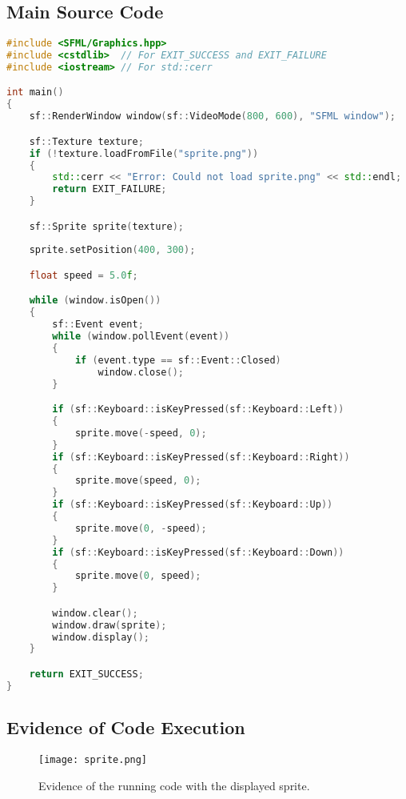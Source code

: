 \documentclass[12pt,a4paper]{article}
\begin{document}
\subsection{Main Source Code}
\begin{lstlisting}[language=C++, caption=Main Source Code for PS0]
#include <SFML/Graphics.hpp>
#include <cstdlib>  // For EXIT_SUCCESS and EXIT_FAILURE
#include <iostream> // For std::cerr

int main()
{
    sf::RenderWindow window(sf::VideoMode(800, 600), "SFML window");

    sf::Texture texture;
    if (!texture.loadFromFile("sprite.png"))
    {
        std::cerr << "Error: Could not load sprite.png" << std::endl;
        return EXIT_FAILURE;
    }

    sf::Sprite sprite(texture);
    
    sprite.setPosition(400, 300);

    float speed = 5.0f;

    while (window.isOpen())
    {
        sf::Event event;
        while (window.pollEvent(event))
        {
            if (event.type == sf::Event::Closed)
                window.close();
        }

        if (sf::Keyboard::isKeyPressed(sf::Keyboard::Left))
        {
            sprite.move(-speed, 0);
        }
        if (sf::Keyboard::isKeyPressed(sf::Keyboard::Right))
        {
            sprite.move(speed, 0);
        }
        if (sf::Keyboard::isKeyPressed(sf::Keyboard::Up))
        {
            sprite.move(0, -speed);
        }
        if (sf::Keyboard::isKeyPressed(sf::Keyboard::Down))
        {
            sprite.move(0, speed);
        }

        window.clear();
        window.draw(sprite);
        window.display();
    }

    return EXIT_SUCCESS;
}
\end{lstlisting}

\subsection{Evidence of Code Execution}
\begin{figure}[H]
\centering
\texttt{[image: sprite.png]}
\caption{Evidence of the running code with the displayed sprite.}
\label{fig:evidence-ps0}
\end{figure}
\end{document}
